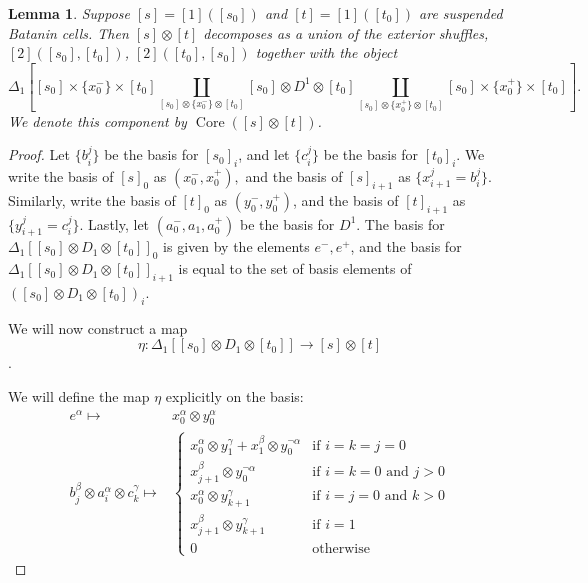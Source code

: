 \documentclass[10pt]{amsart}
\numberwithin{equation}{section}
\theoremstyle{plain}   %
\newtheorem{lemma}[subsection]{Lemma}
\theoremstyle{remark}
\theoremstyle{plain}
\begin{document}
\begin{lemma} Suppose \([s]=[1]([s_0])\) and \([t]=[1]([t_0])\) are suspended Batanin cells.  Then \([s]\otimes [t]\) decomposes as a union of the exterior shuffles, \([2]([s_0],[t_0])\), \([2]([t_0],[s_0])\) together with the object \[\Delta_1\left[ [s_0]\times \{x^-_0\} \times [t_0]\coprod_{[s_0]\otimes \{x^-_0\}\otimes [t_0]} [s_0]\otimes D^1 \otimes [t_0] \coprod_{[s_0]\otimes \{x^+_0\} \otimes [t_0]} [s_0]\times \{x^+_0\} \times [t_0]\right].\]  We denote this component by \(\operatorname{Core}([s]\otimes[t])\).  
\end{lemma}
\begin{proof} Let \(\{b_i^j\}\) be the basis for \([s_0]_i\), and let \(\{c_i^j\}\) be the basis for \([t_0]_i\). We write the basis of \([s]_0\) as \((x^-_0, x^+_0),\) and the basis of \([s]_{i+1}\) as \(\{x^j_{i+1}=b_i^j\}\).  Similarly, write the basis of \([t]_0\) as \((y^-_0, y^+_0)\), and the basis of \([t]_{i+1}\) as \(\{y^j_{i+1}=c^j_i\}\).  Lastly, let \((a^-_0, a_1, a^+_0)\) be the basis for \(D^1\). The basis for \(\Delta_1\left[[s_0] \otimes D_1 \otimes [t_0]\right]_0\) is given by the elements \(e^-,e^+\), and the basis for \(\Delta_1\left[[s_0] \otimes D_1 \otimes [t_0]\right]_{i+1}\) is equal to the set of basis elements of \(([s_0] \otimes D_1 \otimes [t_0])_i\).  

We will now construct a map \[\eta: \Delta_1\left[[s_0] \otimes D_1 \otimes [t_0]\right] \to [s] \otimes [t]\].

We will define the map \(\eta\) explicitly on the basis: 
\begin{align*}
e^\alpha \mapsto& x^\alpha_0 \otimes y^\alpha_0\\
b_j^\beta \otimes a_i^\alpha \otimes c^\gamma_k\mapsto&
\begin{cases} 
x_0^\alpha \otimes y^\gamma_1 + x_1^\beta\otimes y_0^{\neg \alpha} & \text{if \(i=k=j=0\)}\\
x^\beta_{j+1}\otimes y_0^{\neg \alpha} & \text{if \(i=k=0\) and \(j>0\)}\\
x^\alpha_0 \otimes y^\gamma_{k+1} & \text{if \(i=j=0\) and \(k>0\)}\\
x_{j+1}^{\beta} \otimes y^\gamma_{k+1} &\text{if \(i=1\)}\\
0 & \text{otherwise}
\end{cases}
\end{align*}


\end{proof}
\end{document}
